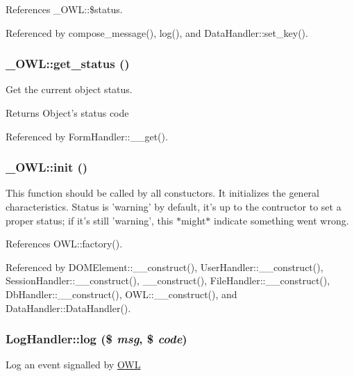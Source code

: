 References \_\-OWL::\$status.



Referenced by compose\_\-message(), log(), and DataHandler::set\_\-key().

\subsubsection[{get\_\-status}]{\setlength{\rightskip}{0pt plus 5cm}\_\-OWL::get\_\-status ()}\label{class__OWL_a99ec771fa2c5c279f80152cc09e489a8}
Get the current object status.

\begin{DoxyReturn}{Returns}
Object's status code 
\end{DoxyReturn}


Referenced by FormHandler::\_\-\_\-get().

\subsubsection[{init}]{\setlength{\rightskip}{0pt plus 5cm}\_\-OWL::init ()}\label{class__OWL_ae0ef3ded56e8a6b34b6461e5a721cd3e}
This function should be called by all constuctors. It initializes the general characteristics. Status is 'warning' by default, it's up to the contructor to set a proper status; if it's still 'warning', this $\ast$might$\ast$ indicate something went wrong. 

References OWL::factory().



Referenced by DOMElement::\_\-\_\-construct(), UserHandler::\_\-\_\-construct(), SessionHandler::\_\-\_\-construct(), \_\-\_\-construct(), FileHandler::\_\-\_\-construct(), DbHandler::\_\-\_\-construct(), OWL::\_\-\_\-construct(), and DataHandler::DataHandler().

\subsubsection[{log}]{\setlength{\rightskip}{0pt plus 5cm}LogHandler::log (\$ {\em msg}, \/  \$ {\em code})}\label{classLogHandler_a6d0139ed72f63093ca00f949ed5a73cb}
Log an event signalled by \hyperlink{classOWL}{OWL}


